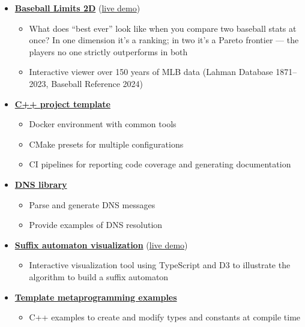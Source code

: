 \documentclass[11pt,a4paper,sans]{moderncv}
\begin{document}
\begin{itemize}[label=\textbullet]
    \item \href{https://github.com/eliogovea/baseball-limits-2d}{\textbf{Baseball Limits 2D}} (\href{https://eliogovea.github.io/baseball-limits-2d/}{\color{blue}live demo})
        \begin{itemize}
            \item What does ``best ever'' look like when you compare two baseball stats at once? In one dimension it's a ranking; in two it's a Pareto frontier --- the players no one strictly outperforms in both
            \item Interactive viewer over 150 years of MLB data (Lahman Database 1871--2023, Baseball Reference 2024)
        \end{itemize}
    \item \href{https://github.com/eliogovea/dev-env-cpp}{\textbf{C++ project template}}
        \begin{itemize}
            \item Docker environment with common tools
            \item CMake presets for multiple configurations
            \item CI pipelines for reporting code coverage and generating documentation
        \end{itemize}
    \item \href{https://github.com/eliogovea/dns}{\textbf{DNS library}}
        \begin{itemize}
            \item Parse and generate DNS messages
            \item Provide examples of DNS resolution
        \end{itemize}
    \item \href{https://github.com/eliogovea/suffix-automaton-vis}{\textbf{Suffix automaton visualization}} (\href{https://eliogovea.github.io/suffix-automaton-vis/}{\color{blue}live demo})
        \begin{itemize}
            \item Interactive visualization tool using TypeScript and D3 to illustrate the algorithm to build a suffix automaton
        \end{itemize}
    \item \href{https://github.com/eliogovea/compile-time-cpp}{\textbf{Template metaprogramming examples}}
        \begin{itemize}
            \item C++ examples to create and modify types and constants at compile time

\end{itemize}
\end{itemize}
\end{document}
